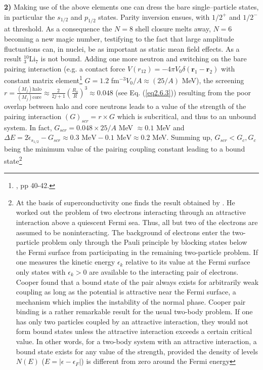 \textbf{2)} Making use of the above elements one can dress the bare single--particle states, in particular the $s_{1/2}$ and $p_{1/2}$ states. Parity inversion ensues, with $1/2^+$ and $1/2^-$ at threshold. As a consequence the $N=8$ shell closure melts away, $N=6$ becoming a new magic number, testifying to the fact that  large amplitude fluctuations can,  in nuclei, be as important as static mean field effects. As a result $^{10}_3$Li$_7$ is not bound. Adding one more neutron and switching on the bare pairing interaction (e.g. a contact force $V(r_{12})=-4\pi V_0\delta(\mathbf r_1-\mathbf r_2)$ with constant matrix element\footnote{\cite{Brink:05}, pp 40-42.} $G=1.2$ fm$^{-3}V_0/A\approx (25/A)$ MeV), the screening  $r=\frac{(M_j)\text{halo}}{(M_j)\text{core}}\approx \frac{2}{2j+1}\left(\frac{R_0}{R}\right)^3\approx 0.048$ (see Eq. (\ref{eq2.6.3})) resulting from the poor overlap between halo and core neutrons leads to  a value of the strength of the pairing interaction $(G)_{scr}=r\times G$ which is subcritical, and thus to  an unbound system. In fact, $G_{scr}=0.048\times25/A$ MeV $\approx0.1$ MeV and $\Delta E=2\tilde\epsilon_{s_{1/2}}-G_{scr}\approx0.3\text{ MeV}-0.1\text{ MeV}\approx 0.2$ MeV. Summing up, $G_{scr}<G_c, G_c$ being the minimum value of the pairing coupling constant leading to a bound state\footnote{At the basis of superconductivity one finds the result obtained by \cite{Cooper:56}. He worked out the problem of two electrons interacting through an attractive interaction above a quiescent Fermi sea. Thus, all but two of the electrons are assumed to be noninteracting. The background of electrons enter the two-particle problem only through the Pauli principle by blocking states below the Fermi surface from participating in the remaining two-particle problem. If one measures the kinetic energy $\epsilon_k$ relative to its value at the Fermi surface only states with $\epsilon_k>0$ are available to the interacting pair of electrons. Cooper found that a bound state of the pair always exists for arbitrarily weak coupling as long as the potential is attractive near the Fermi surface, a mechanism which implies the instability of the normal phase. Cooper pair binding is a rather remarkable result for the usual two-body problem. If one has only two particles coupled by an attractive interaction, they would not form bound states unless the attractive interaction exceeds a certain critical value. In other words, for a two-body system with an attractive interaction, a bound state exists for any value of the strength, provided the density of levels $N(E)$ ($E=|\epsilon-\epsilon_F|$) is different from zero around the Fermi energy 
}

